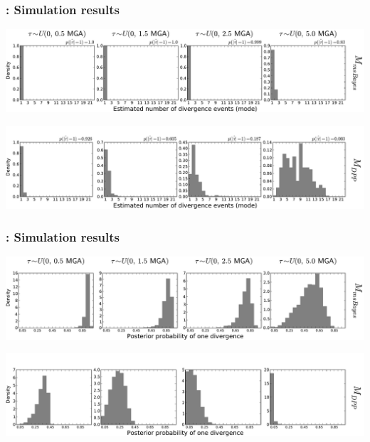 \begin{frame}[t]
    \frametitle{\dppmsbayes: Simulation results}
    \vspace{1cm}
        \centerline{
        \includegraphics[width=1.13\textwidth]{images/old_old_power_psi_mode.pdf}}
        \vspace{0mm}
        \centerline{
        \includegraphics[width=1.13\textwidth]{images/old_dpp_power_psi_mode_headless.pdf}}
\end{frame}

\begin{frame}[t]
    \frametitle{\dppmsbayes: Simulation results}
    \vspace{1cm}
        \centerline{
        \includegraphics[width=1.13\textwidth]{images/old_old_power_psi_prob.pdf}}
        \vspace{0mm}
        \centerline{
        \includegraphics[width=1.13\textwidth]{images/old_dpp_power_psi_prob_headless.pdf}}
\end{frame}


